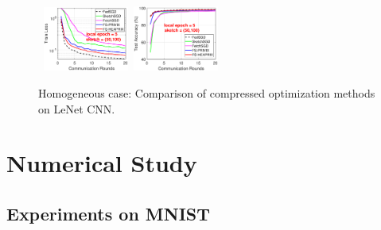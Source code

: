 \documentclass[sigconf, anonymous, review]{acmart}
\begin{document}
\begin{figure}[t]
\begin{center}
{		}
				\mbox{\hspace{-0.25in}		
		\includegraphics[width=0.25\textwidth]{MNIST_figures/local5_sketch50_iid1_train_loss.eps}\hspace{-0.12in}
		\includegraphics[width=0.25\textwidth]{MNIST_figures/local5_sketch50_iid1_test_acc.eps}
		}
	\end{center}
	
	\caption{Homogeneous case: Comparison of compressed optimization methods on LeNet CNN.}
    \label{fig:MNIST-iid1}
    
\end{figure}


\section{Numerical Study}\label{sec:experiment}


\subsection{Experiments on MNIST}
\end{document}
